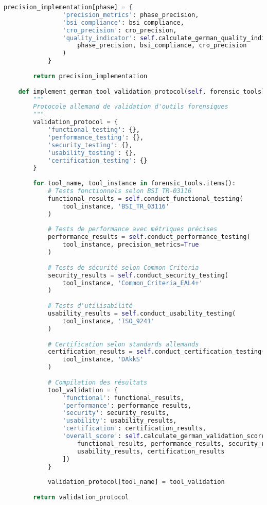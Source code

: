 \begin{lstlisting}[language=Python, caption=Framework BKA avec rigueur technique allemande]
            precision_implementation[phase] = {
                'precision_metrics': phase_precision,
                'bsi_compliance': bsi_compliance,
                'cro_precision': cro_precision,
                'quality_indicator': self.calculate_german_quality_indicator(
                    phase_precision, bsi_compliance, cro_precision
                )
            }
            
        return precision_implementation
    
    def implement_german_tool_validation_protocol(self, forensic_tools):
        """
        Protocole allemand de validation d'outils forensiques
        """
        validation_protocol = {
            'functional_testing': {},
            'performance_testing': {},
            'security_testing': {},
            'usability_testing': {},
            'certification_testing': {}
        }
        
        for tool_name, tool_instance in forensic_tools.items():
            # Tests fonctionnels selon BSI TR-03116
            functional_results = self.conduct_functional_testing(
                tool_instance, 'BSI_TR_03116'
            )
            
            # Tests de performance avec métriques précises
            performance_results = self.conduct_performance_testing(
                tool_instance, precision_metrics=True
            )
            
            # Tests de sécurité selon Common Criteria
            security_results = self.conduct_security_testing(
                tool_instance, 'Common_Criteria_EAL4+'
            )
            
            # Tests d'utilisabilité
            usability_results = self.conduct_usability_testing(
                tool_instance, 'ISO_9241'
            )
            
            # Certification selon standards allemands
            certification_results = self.conduct_certification_testing(
                tool_instance, 'DAkkS'
            )
            
            # Compilation des résultats
            tool_validation = {
                'functional': functional_results,
                'performance': performance_results,
                'security': security_results,
                'usability': usability_results,
                'certification': certification_results,
                'overall_score': self.calculate_german_validation_score([
                    functional_results, performance_results, security_results,
                    usability_results, certification_results
                ])
            }
            
            validation_protocol[tool_name] = tool_validation
            
        return validation_protocol
\end{lstlisting}

